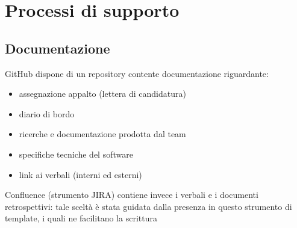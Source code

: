 \section{Processi di supporto}

\subsection{Documentazione}
GitHub dispone di un repository contente documentazione riguardante:
\begin{itemize}
    \item assegnazione appalto (lettera di candidatura)
    \item diario di bordo
    \item ricerche e documentazione prodotta dal team
    \item specifiche tecniche del software
    \item link ai verbali (interni ed esterni)
\end{itemize}
Confluence (strumento JIRA) contiene invece i verbali e i documenti retrospettivi: tale sceltà è stata guidata dalla presenza in questo strumento di template, i quali ne facilitano la scrittura